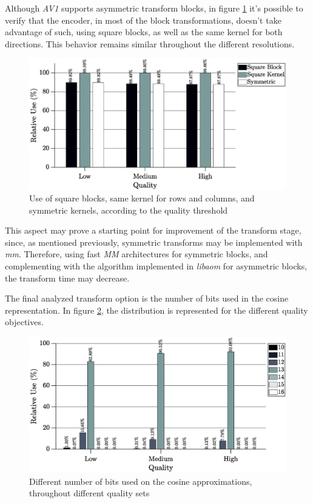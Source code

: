 Although \emph{AV1} supports asymmetric transform blocks, in figure \ref{fig:squareavg} it's possible to verify that the encoder, in most of the block transformations, doesn't take advantage of such, using square blocks, as well as the same kernel for both directions. This behavior remains similar throughout the different resolutions.

\begin{figure}[!htpb]
    \centering
    \includegraphics[width=\textwidth]{Sections/3Transforms/Images/squareAvg.eps}
    \caption{Use of square blocks, same kernel for rows and columns, and symmetric kernels, according to the quality threshold}
    \label{fig:squareavg}
\end{figure}

This aspect may prove a starting point for improvement of the transform stage, since, as mentioned previously, symmetric transforms may be implemented with \emph{\gls{mm}}. Therefore, using fast \emph{MM} architectures for symmetric blocks, and complementing with the algorithm implemented in \emph{libaom} for asymmetric blocks, the transform time may decrease.

The final analyzed transform option is the number of bits used in the cosine representation. In figure \ref{fig:cosbitavg}, the distribution is represented for the different quality objectives. 

\begin{figure}[!htpb]
    \centering
    \includegraphics[width=\textwidth]{Sections/3Transforms/Images/cosBitAvg.eps}
    \caption{Different number of bits used on the cosine approximations, throughout different quality sets}
    \label{fig:cosbitavg}
\end{figure}


